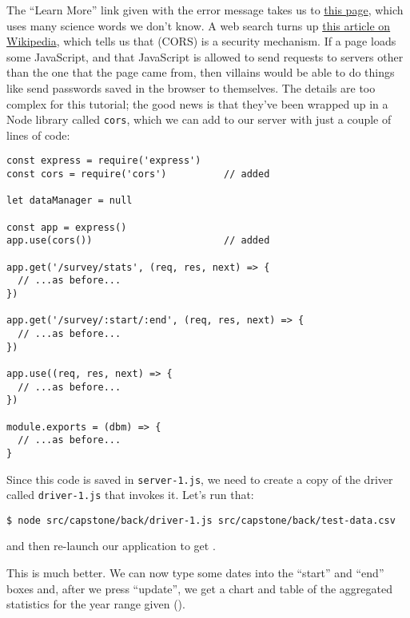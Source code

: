 \noindent
The ``Learn More'' link given with the error message takes us to
\href{https://developer.mozilla.org/en-US/docs/Web/HTTP/CORS/Errors/CORSMissingAllowOrigin}{this page},
which uses many science words we don't know.
A web search turns up \href{https://en.wikipedia.org/wiki/Cross-origin_resource_sharing}{this article on Wikipedia},
which tells us that  (CORS)
is a security mechanism.
If a page loads some JavaScript,
and that JavaScript is allowed to send requests to servers other than the one that the page came from,
then villains would be able to do things like send passwords saved in the browser to themselves.
The details are too complex for this tutorial;
the good news is that they've been wrapped up in a Node library called \texttt{cors},
which we can add to our server with just a couple of lines of code:

\begin{verbatim}
const express = require('express')
const cors = require('cors')          // added

let dataManager = null

const app = express()
app.use(cors())                       // added

app.get('/survey/stats', (req, res, next) => {
  // ...as before...
})

app.get('/survey/:start/:end', (req, res, next) => {
  // ...as before...
})

app.use((req, res, next) => {
  // ...as before...
})

module.exports = (dbm) => {
  // ...as before...
}
\end{verbatim}

Since this code is saved in \texttt{server-1.js},
we need to create a copy of the driver called \texttt{driver-1.js} that invokes it.
Let's run that:

\begin{verbatim}
$ node src/capstone/back/driver-1.js src/capstone/back/test-data.csv
\end{verbatim}

\noindent
and then re-launch our application to get .


This is much better.
We can now type some dates into the ``start'' and ``end'' boxes and,
after we press ``update'',
we get a chart and table of the aggregated statistics for the year range given
().

